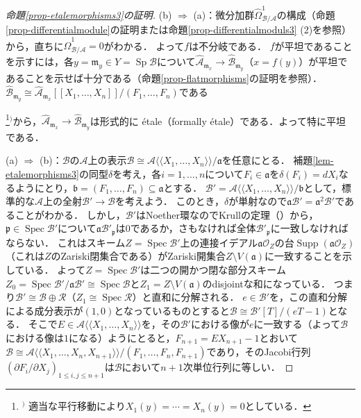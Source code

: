 \documentclass[a4paper,12pt, dvipdfmx]{jsbook}
\def\O{\mathscr{O}}
\def\m{\mathfrak{m}}
\def\Spec{\mathop{\mathrm{Spec}}\nolimits}
\def\Sp{\mathop{\mathrm{Sp}}\nolimits}
\def\Supp{\mathop{\mathrm{Supp}}\nolimits}
\def\dl{\langle\!\langle}
\def\dr{\rangle\!\rangle}
\theoremstyle{plain}
\theoremstyle{definition}
\newcounter{chushaku}
\def\chu#1{\addtocounter{chushaku}{1}\footnote[\value{chushaku}]{${}^)$ #1}${}^)$}
\begin{document}
\begin{proof}[{\rm 命題\ref{prop-etalemorphisms3}の証明}]
(b) $\Rightarrow$ (a)：微分加群$\widehat{\Omega}^1_{\mathcal{B}/\mathcal{A}}$の構成（命題\ref{prop-differentialmodule}の証明または命題\ref{prop-differentialmoduls3} (2)を参照）から，直ちに$\widehat{\Omega}^1_{\mathcal{B}/\mathcal{A}}=0$がわかる．
よって$f$は不分岐である．
$f$が平坦であることを示すには，各$y=\m_y\in Y=\Sp\mathcal{B}$について$\widehat{\mathcal{A}}_{\m_x}\rightarrow\widehat{\mathcal{B}}_{\m_y}$（$x=f(y)$）が平坦であることを示せば十分である（命題\ref{prop-flatmorphisms}の証明を参照）．
$\widehat{\mathcal{B}}_{\m_y}\cong\widehat{\mathcal{A}}_{\m_x}[\![X_1,\ldots,X_n]\!]/(F_1,\ldots,F_n)$である\chu{適当な平行移動により$X_1(y)=\cdots=X_n(y)=0$としている．}から，$\widehat{\mathcal{A}}_{\m_x}\rightarrow\widehat{\mathcal{B}}_{\m_y}$は形式的に \'etale（formally \'etale）である．よって特に平坦である．

(a) $\Rightarrow$ (b)：$\mathcal{B}$の$\mathcal{A}$上の表示$\mathcal{B}\cong\mathcal{A}\dl X_1,\ldots,X_n\dr/\mathfrak{a}$を任意にとる．
補題\ref{lem-etalemorphisms3}の同型$\delta$を考え，各$i=1,\ldots,n$について$F_i\in\mathfrak{a}$を$\delta(F_i)=dX_i$なるようにとり，$\mathfrak{b}=(F_1,\ldots,F_n)\subseteq\mathfrak{a}$とする．
$\mathcal{B}'=\mathcal{A}\dl X_1,\ldots,X_n\dr/\mathfrak{b}$として，標準的な$\mathcal{A}$上の全射$\mathcal{B}'\rightarrow\mathcal{B}$を考えよう．
このとき，$\delta$が単射なので$\mathfrak{a}\mathcal{B}'=\mathfrak{a}^2\mathcal{B}'$であることがわかる．
しかし，$\mathcal{B}'$はNoether環なのでKrullの定理（\cite[Theorem 8.10]{Matsu}）から，$\mathfrak{p}\in\Spec\mathcal{B}'$について$\mathfrak{a}\mathcal{B}'_{\mathfrak{p}}$は$0$であるか，さもなければ全体$\mathcal{B}'_{\mathfrak{p}}$に一致しなければならない．
これはスキーム$Z=\Spec\mathcal{B}'$上の連接イデアル$\mathfrak{a}\O_Z$の台$\Supp(\mathfrak{a}\O_Z)$（これは$Z$のZariski閉集合である）がZariski開集合$Z\setminus V(\mathfrak{a})$に一致することを示している．
よって$Z=\Spec\mathcal{B}'$は二つの開かつ閉な部分スキーム$Z_0=\Spec\mathcal{B}'/\mathfrak{a}\mathcal{B}'\cong\Spec\mathcal{B}$と$Z_1=Z\setminus V(\mathfrak{a})$のdisjointな和になっている．
つまり$\mathcal{B}'\cong\mathcal{B}\oplus\mathcal{R}$（$Z_1\cong\Spec\mathcal{R}$）と直和に分解される．
$e\in\mathcal{B}'$を，この直和分解による成分表示が$(1,0)$となっているものとすると$\mathcal{B}\cong\mathcal{B}'[T]/(eT-1)$となる．
そこで$E\in\mathcal{A}\dl X_1,\ldots,X_n\dr$を，その$\mathcal{B}'$における像が$e$に一致する（よって$\mathcal{B}$における像は$1$になる）ようにとると，$F_{n+1}=EX_{n+1}-1$とおいて$\mathcal{B}\cong\mathcal{A}\dl X_1,\ldots,X_n,X_{n+1}\dr/(F_1,\ldots,F_n,F_{n+1})$であり，そのJacobi行列$(\partial F_i/\partial X_j)_{1\leq i,j\leq n+1}$は$\mathcal{B}$において$n+1$次単位行列に等しい．
\end{proof}
\end{document}
